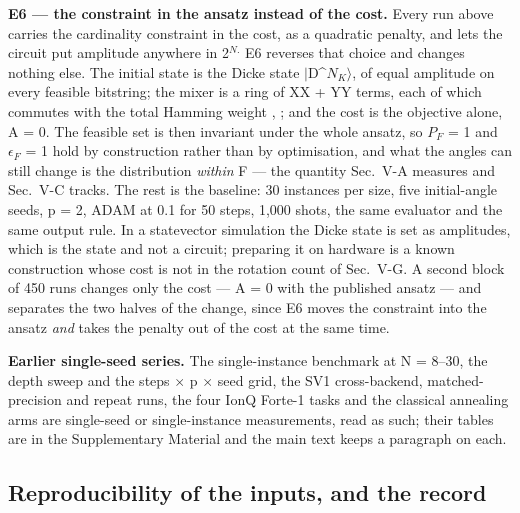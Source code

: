 \documentclass{ieeeaccess}
\begin{document}
\textbf{E6 --- the constraint in the ansatz instead of the cost.} Every run above carries the cardinality constraint in the cost, as a quadratic penalty, and lets the circuit put amplitude anywhere in 2$^{N.}$ E6 reverses that choice and changes nothing else. The initial state is the Dicke state $|$D\^{}$N_{K}$$\rangle$, of equal amplitude on every feasible bitstring; the mixer is a ring of XX + YY terms, each of which commutes with the total Hamming weight \cite{ref45}, \cite{ref46}; and the cost is the objective alone, A = 0. The feasible set is then invariant under the whole ansatz, so $P_{F}$ = 1 and $\epsilon_{F}$ = 1 hold by construction rather than by optimisation, and what the angles can still change is the distribution \textit{within} F --- the quantity Sec.~V-A measures and Sec.~V-C tracks. The rest is the baseline: 30 instances per size, five initial-angle seeds, p = 2, ADAM at 0.1 for 50 steps, 1,000 shots, the same evaluator and the same output rule. In a statevector simulation the Dicke state is set as amplitudes, which is the state and not a circuit; preparing it on hardware is a known construction \cite{ref49} whose cost is not in the rotation count of Sec.~V-G. A second block of 450 runs changes only the cost --- A = 0 with the published ansatz --- and separates the two halves of the change, since E6 moves the constraint into the ansatz \textit{and} takes the penalty out of the cost at the same time.


\textbf{Earlier single-seed series.} The single-instance benchmark at N = 8--30, the depth sweep and the steps $\times$ p $\times$ seed grid, the SV1 cross-backend, matched-precision and repeat runs, the four IonQ Forte-1 tasks and the classical annealing arms are single-seed or single-instance measurements, read as such; their tables are in the Supplementary Material and the main text keeps a paragraph on each.


\subsection{Reproducibility of the inputs, and the record}
\end{document}
